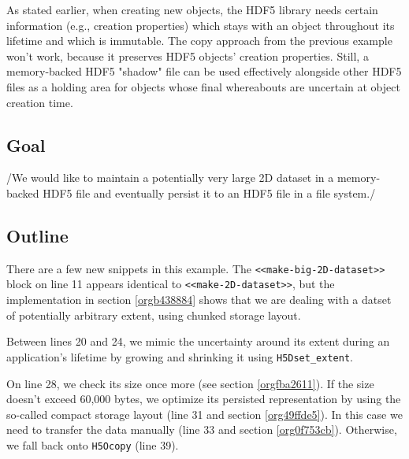 \documentclass[a4paper, 12pt]{article}
\begin{document}
As stated earlier, when creating new objects, the HDF5 library needs certain
information (e.g., creation properties) which stays with an object throughout
its lifetime and which is immutable. The copy approach from the previous
example won't work, because it preserves HDF5 objects' creation properties.
Still, a memory-backed HDF5 "shadow" file can be used effectively alongside
other HDF5 files as a holding area for objects whose final whereabouts are
uncertain at object creation time.

\subsection{Goal}
\label{sec:org6ba380f}

/We would like to maintain a potentially very large 2D dataset in a
memory-backed HDF5 file and eventually persist it to an HDF5 file in a file
system./

\subsection{Outline}
\label{sec:org48b5989}

There are a few new snippets in this example. The \texttt{<<make-big-2D-dataset>>}
block on line 11 appears identical to \texttt{<<make-2D-dataset>>}, but the
implementation in section \ref{orgb438884} shows that we are dealing
with a datset of potentially arbitrary extent, using chunked storage layout.

Between lines 20 and 24, we mimic the uncertainty around its
extent during an application's lifetime by growing and shrinking it using
\texttt{H5Dset\_extent}.

On line 28, we check its size once more (see section
\ref{orgfba2611}). If the size doesn't exceed 60,000 bytes, we optimize its
persisted representation by using the so-called compact storage layout (line
31 and section \ref{org49ffde5}). In this case we need to transfer
the data manually (line 33 and section \ref{org0f753cb}).  Otherwise,
we fall back onto \texttt{H5Ocopy} (line 39).
\end{document}

